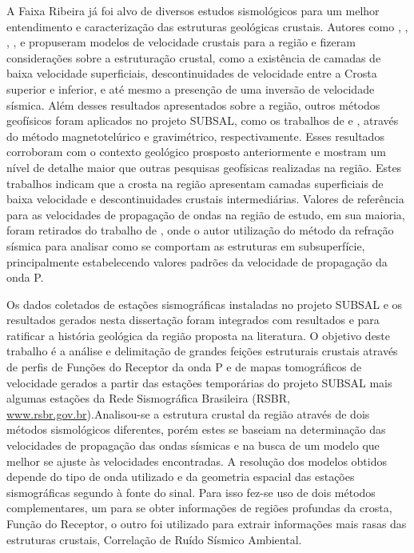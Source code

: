 A Faixa Ribeira já foi alvo de diversos estudos sismológicos para um melhor entendimento e caracterização das estruturas geológicas crustais. Autores como \cite{Bassini_1986}, \cite{souza_crustal_1991}, \cite{souza_shear-wave_1995}, \cite{assumpcao_crustal_2002}, \cite{dias_cario_crustal_2006} e \cite{sand_franca_crustal_2004} propuseram modelos de velocidade crustais para a região e fizeram considerações sobre a estruturação crustal, como a existência de camadas de baixa velocidade superficiais, descontinuidades de velocidade entre a Crosta superior e inferior, e até mesmo a presenção de uma inversão de velocidade sísmica. Além desses resultados apresentados sobre a região, outros métodos geofísicos foram aplicados no projeto SUBSAL, como os trabalhos de \cite{flora_solon_ancient_2013} e \cite{Silva_2014}, através do método magnetotelúrico e gravimétrico, respectivamente. Esses resultados corroboram com o contexto geológico prosposto anteriormente e mostram um nível de detalhe maior que outras pesquisas geofísicas realizadas na região. Estes trabalhos indicam que a crosta na região apresentam camadas superficiais de baixa velocidade e descontinuidades crustais intermediárias. Valores de referência para as velocidades de propagação de ondas na região de estudo, em sua maioria, foram retirados do trabalho de \cite{Bassini_1986}, onde o autor utilização do método da refração sísmica para analisar como se comportam as estruturas em subsuperfície, principalmente estabelecendo valores padrões da velocidade de propagação da onda P.

Os dados coletados de estações sismográficas instaladas no projeto SUBSAL e os resultados gerados nesta dissertação foram integrados com resultados \cite{flora_solon_ancient_2013} e \cite{Silva_2014} para ratificar a história geológica da região proposta na literatura. O objetivo deste trabalho é a análise e delimitação de grandes feições estruturais crustais através de perfis de Funções do Receptor da onda P e de mapas tomográficos de velocidade gerados a partir das estações temporárias do projeto SUBSAL mais algumas estações da Rede Sismográfica Brasileira (RSBR, \url{www.rsbr.gov.br}).Analisou-se a estrutura crustal da região através de dois métodos sismológicos diferentes, porém estes se baseiam na determinação das velocidades de propagação das ondas sísmicas e na busca de um modelo que melhor se ajuste às velocidades encontradas. A resolução dos modelos obtidos depende do tipo de onda utilizado e da geometria espacial das estações sismográficas segundo à fonte do sinal. Para isso fez-se uso de dois métodos complementares, um para se obter informações de regiões profundas da crosta, Função do Receptor, o outro foi utilizado para extrair informações mais rasas das estruturas crustais, Correlação de Ruído Sísmico Ambiental.

